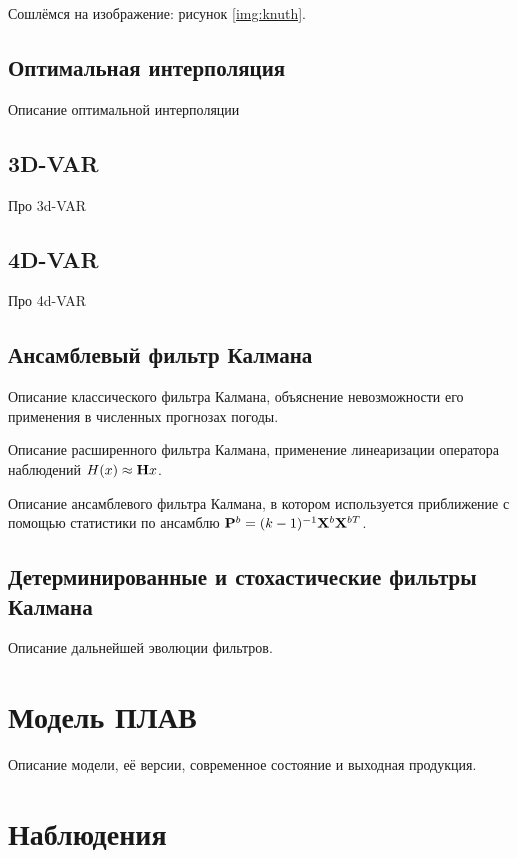 Сошлёмся на изображение: рисунок \ref{img:knuth}.

\subsection{Оптимальная интерполяция} \label{subsect1_2_1}

Описание оптимальной интерполяции

\subsection{3D-VAR} \label{subsubsect1_2_2}
Про 3d-VAR

\subsection{4D-VAR} \label{subsubsect1_2_3}
Про 4d-VAR

\subsection{Ансамблевый фильтр Калмана} \label{subsubsect1_2_4}
Описание классического фильтра Калмана, объяснение невозможности его применения в численных прогнозах погоды.

Описание расширенного фильтра Калмана, применение линеаризации оператора наблюдений $H (x) \approx  \mathbf{H} x $.

Описание ансамблевого фильтра Калмана, в котором используется приближение с помощью статистики по ансамблю $\mathbf{P}^b = (k-1)^{-1} \mathbf{X}^b \mathbf{X}^{bT} $.

\subsection{Детерминированные и стохастические фильтры Калмана} \label{subsubsect1_2_5}
Описание дальнейшей эволюции фильтров.

\section{Модель ПЛАВ} \label{sect1_3}

Описание модели, её версии, современное состояние и выходная продукция.

\section{Наблюдения} \label{sect1_4}

